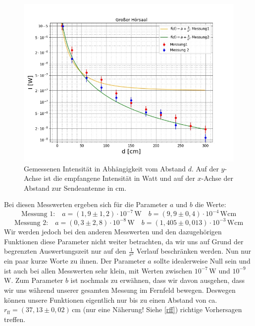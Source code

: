 \documentclass[titlepage,11pt,a4paper,ngerman]{article}
\newcommand{\tx}[1]{\textrm{#1}}
\begin{document}
\begin{figure}
	\includegraphics[scale=0.5]{Bilder/Abstand-GrH.jpg}
	\centering
	\caption{Gemessenen Intensität in Abhängigkeit vom Abstand $d$. Auf der $y$-Achse ist die empfangene Intensität in Watt und auf der $x$-Achse der Abstand zur Sendeantenne in cm.}
\end{figure}

Bei diesen Messwerten ergeben sich für die Parameter $a$ und $b$ die Werte:
\begin{equation*}
\tx{Messung 1:} \quad a = (1{,}9\pm1{,}2)\cdot10^{-7}\,\tx{W} \quad b = (9{,}9\pm0{,}4)\cdot10^{-4}\,\tx{Wcm}
\end{equation*}
\begin{equation*}
\tx{Messung 2:} \quad a = (0{,}3\pm2{,}8)\cdot10^{-8}\,\tx{W} \quad b = (1{,405\pm0{,}013})\cdot10^{-3} \,\tx{Wcm}
\end{equation*}
Wir werden jedoch bei den anderen Messwerten und den dazugehörigen Funktionen diese Parameter nicht weiter betrachten, da wir uns auf Grund der begrenzten Auswertungszeit nur auf den $\frac{1}{x^{2}}$ Verlauf beschränken werden. Nun nur ein paar kurze Worte zu ihnen. Der Parameter $a$ sollte idealerweise Null sein und ist auch bei allen Messwerten sehr klein, mit Werten zwischen $10^{-7}\,$W und $10^{-9}\,$W. Zum Parameter $b$ ist nochmals zu erwähnen, dass wir davon ausgehen, dass wir uns während unserer gesamten Messung im Fernfeld bewegen. Deswegen können unsere Funktionen eigentlich nur bis zu einen Abstand von ca. $r_{\tx{ff}}=(37{,}13\pm0{,}02)\,$cm (nur eine Näherung! Siehe \eqref{rff}) richtige Vorhersagen treffen. 
\end{document}
